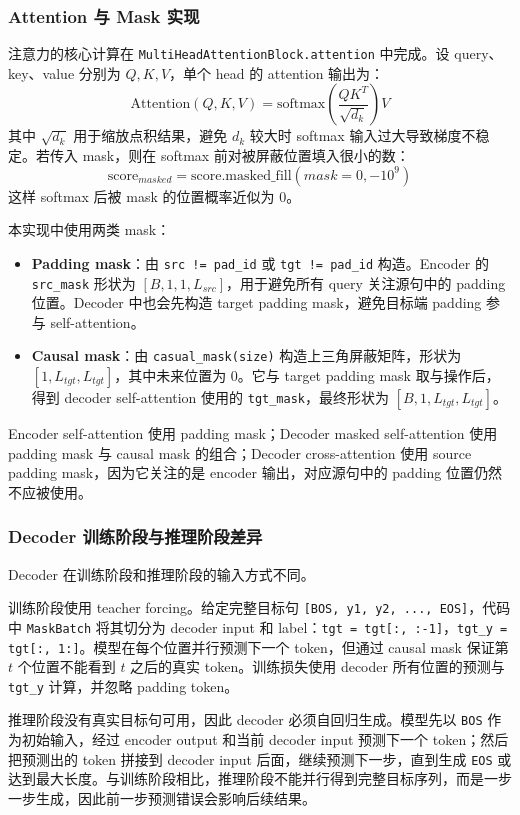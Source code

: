 ﻿\documentclass[UTF8,a4paper,12pt]{ctexart}
\begin{document}
\subsubsection{Attention 与 Mask 实现}

注意力的核心计算在 \texttt{MultiHeadAttentionBlock.attention} 中完成。设 query、key、value 分别为 $Q,K,V$，单个 head 的 attention 输出为：
\[
\mathrm{Attention}(Q,K,V)=\mathrm{softmax}\left(\frac{QK^T}{\sqrt{d_k}}\right)V
\]
其中 $\sqrt{d_k}$ 用于缩放点积结果，避免 $d_k$ 较大时 softmax 输入过大导致梯度不稳定。若传入 mask，则在 softmax 前对被屏蔽位置填入很小的数：
\[
\mathrm{score}_{masked}=\mathrm{score}.\mathrm{masked\_fill}(mask=0,-10^9)
\]
这样 softmax 后被 mask 的位置概率近似为 0。

本实现中使用两类 mask：
\begin{itemize}
  \item \textbf{Padding mask}：由 \texttt{src != pad\_id} 或 \texttt{tgt != pad\_id} 构造。Encoder 的 \texttt{src\_mask} 形状为 $[B,1,1,L_{src}]$，用于避免所有 query 关注源句中的 padding 位置。Decoder 中也会先构造 target padding mask，避免目标端 padding 参与 self-attention。
  \item \textbf{Causal mask}：由 \texttt{casual\_mask(size)} 构造上三角屏蔽矩阵，形状为 $[1,L_{tgt},L_{tgt}]$，其中未来位置为 0。它与 target padding mask 取与操作后，得到 decoder self-attention 使用的 \texttt{tgt\_mask}，最终形状为 $[B,1,L_{tgt},L_{tgt}]$。
\end{itemize}

Encoder self-attention 使用 padding mask；Decoder masked self-attention 使用 padding mask 与 causal mask 的组合；Decoder cross-attention 使用 source padding mask，因为它关注的是 encoder 输出，对应源句中的 padding 位置仍然不应被使用。

\subsubsection{Decoder 训练阶段与推理阶段差异}

Decoder 在训练阶段和推理阶段的输入方式不同。

训练阶段使用 teacher forcing。给定完整目标句 \texttt{[BOS, y1, y2, ..., EOS]}，代码中 \texttt{MaskBatch} 将其切分为 decoder input 和 label：\texttt{tgt = tgt[:, :-1]}，\texttt{tgt\_y = tgt[:, 1:]}。模型在每个位置并行预测下一个 token，但通过 causal mask 保证第 $t$ 个位置不能看到 $t$ 之后的真实 token。训练损失使用 decoder 所有位置的预测与 \texttt{tgt\_y} 计算，并忽略 padding token。

推理阶段没有真实目标句可用，因此 decoder 必须自回归生成。模型先以 \texttt{BOS} 作为初始输入，经过 encoder output 和当前 decoder input 预测下一个 token；然后把预测出的 token 拼接到 decoder input 后面，继续预测下一步，直到生成 \texttt{EOS} 或达到最大长度。与训练阶段相比，推理阶段不能并行得到完整目标序列，而是一步一步生成，因此前一步预测错误会影响后续结果。
\end{document}
